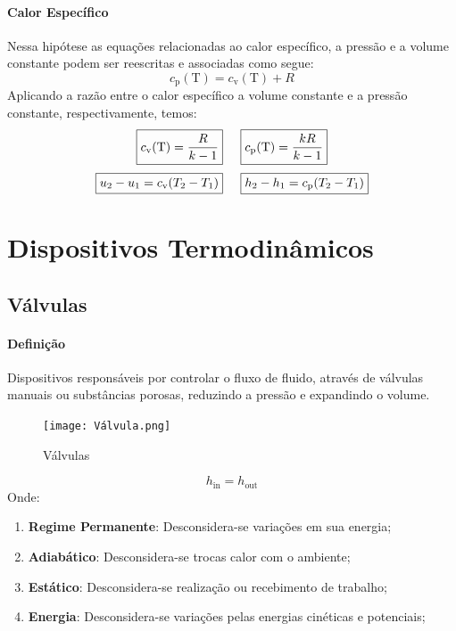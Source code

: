 \documentclass{article}
\begin{document}
            \paragraph{Calor Específico}Nessa hipótese as equações relacionadas ao calor específico, a pressão e a volume constante podem ser reescritas e associadas como segue:
                \[\boxed{c_{\text{p}}(\text{T}) = c_{\text{v}}(\text{T}) + R}\]
            Aplicando a razão entre o calor específico a volume constante e a pressão constante, respectivamente, temos:
                \[
                    \boxed{c_{\text{v}}(\text{T}) = \frac{R}{k - 1}} \hspace{5mm}
                    \boxed{c_{\text{p}}(\text{T}) = \frac{kR}{k - 1}}
                \]
                \[
                    \boxed{u_{2} - u_{1} = c_{\text{v}}(T_{2} - T_{1})} \hspace{5mm}
                    \boxed{h_{2} - h_{1} = c_{\text{p}}(T_{2} - T_{1})}
                \]
\newpage

    \section{Dispositivos Termodinâmicos}
        \subsection{Válvulas}
            \paragraph{Definição}Dispositivos responsáveis por controlar o fluxo de fluido, através de válvulas manuais ou substâncias porosas, reduzindo a pressão e expandindo o volume.
                \begin{figure}[h]
                    \centering
                    \texttt{[image: Válvula.png]}
                    \caption{Válvulas}
                \end{figure}
                \[\boxed{h_{\text{in}} = h_{\text{out}}}\]
            Onde:
                \begin{enumerate}[noitemsep]
                    \item \textbf{Regime Permanente}: Desconsidera-se variações em sua energia;
                    \item \textbf{Adiabático}: Desconsidera-se trocas calor com o ambiente;
                    \item \textbf{Estático}: Desconsidera-se realização ou recebimento de trabalho;
                    \item \textbf{Energia}: Desconsidera-se variações pelas energias cinéticas e potenciais;
                \end{enumerate}
\end{document}
